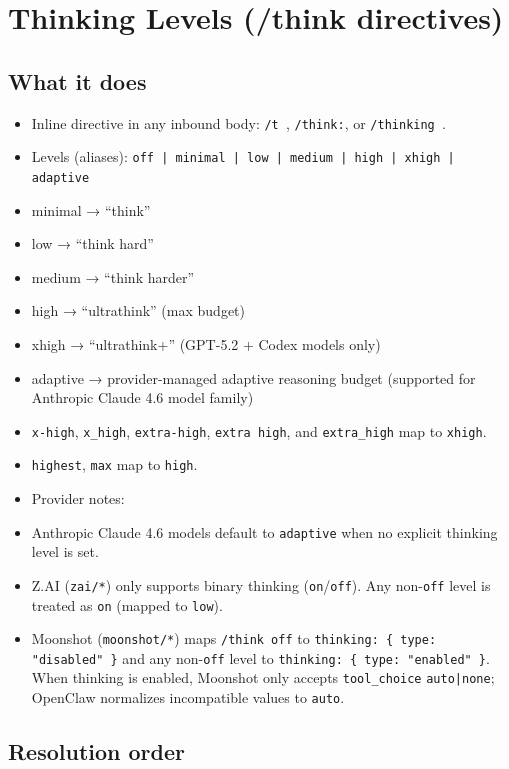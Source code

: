 \section{Thinking Levels (/think directives)}


\subsection{What it does}


\begin{itemize}
  \item Inline directive in any inbound body: \texttt{/t }, \texttt{/think:}, or \texttt{/thinking }.
  \item Levels (aliases): \texttt{off | minimal | low | medium | high | xhigh | adaptive}
  \item minimal → “think”
  \item low → “think hard”
  \item medium → “think harder”
  \item high → “ultrathink” (max budget)
  \item xhigh → “ultrathink+” (GPT-5.2 + Codex models only)
  \item adaptive → provider-managed adaptive reasoning budget (supported for Anthropic Claude 4.6 model family)
  \item \texttt{x-high}, \texttt{x\_high}, \texttt{extra-high}, \texttt{extra high}, and \texttt{extra\_high} map to \texttt{xhigh}.
  \item \texttt{highest}, \texttt{max} map to \texttt{high}.
  \item Provider notes:
  \item Anthropic Claude 4.6 models default to \texttt{adaptive} when no explicit thinking level is set.
  \item Z.AI (\texttt{zai/*}) only supports binary thinking (\texttt{on}/\texttt{off}). Any non-\texttt{off} level is treated as \texttt{on} (mapped to \texttt{low}).
  \item Moonshot (\texttt{moonshot/*}) maps \texttt{/think off} to \texttt{thinking: \{ type: "disabled" \}} and any non-\texttt{off} level to \texttt{thinking: \{ type: "enabled" \}}. When thinking is enabled, Moonshot only accepts \texttt{tool\_choice} \texttt{auto|none}; OpenClaw normalizes incompatible values to \texttt{auto}.
\end{itemize}


\subsection{Resolution order}


